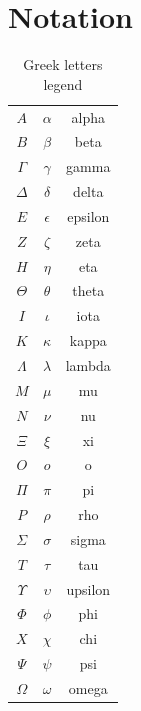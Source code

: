 \chapter{Notation}

\begin{table}[!ht]
	\label{tab:greek_letters_legend}
	\caption{Greek letters legend}
	\renewcommand{\arraystretch}{1}
	\centering
	\begin{tabular}{ccc}
		$A$        & $\alpha$   & alpha   \\
		$B$        & $\beta$    & beta    \\
		$\Gamma$   & $\gamma$   & gamma   \\
		$\Delta$   & $\delta$   & delta   \\
		$E$        & $\epsilon$ & epsilon \\
		$Z$        & $\zeta$    & zeta    \\
		$H$        & $\eta$     & eta     \\
		$\Theta$   & $\theta$   & theta   \\
		$I$        & $\iota$    & iota    \\
		$K$        & $\kappa$   & kappa   \\
		$\Lambda$  & $\lambda$  & lambda  \\
		$M$        & $\mu$      & mu      \\
		$N$        & $\nu$      & nu      \\
		$\Xi$      & $\xi$      & xi      \\
		$O$        & $o$        & o       \\
		$\Pi$      & $\pi$      & pi      \\
		$P$        & $\rho$     & rho     \\
		$\Sigma$   & $\sigma$   & sigma   \\
		$T$        & $\tau$     & tau     \\
		$\Upsilon$ & $\upsilon$ & upsilon \\
		$\Phi$     & $\phi$     & phi     \\
		$X$        & $\chi$     & chi     \\
		$\Psi$     & $\psi$     & psi     \\
		$\Omega$   & $\omega$   & omega   \\
	\end{tabular}
\end{table}

